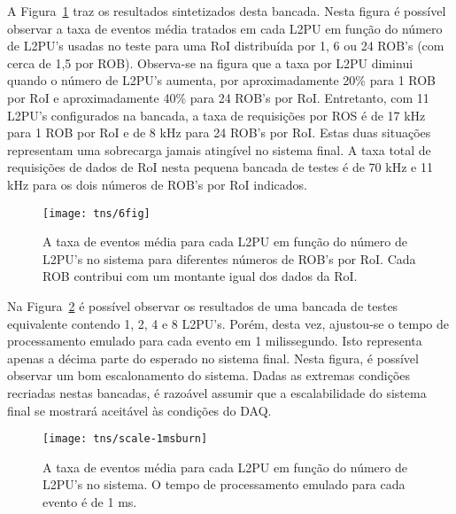 A Figura~\ref{fig:tns-6fig} traz os resultados sintetizados desta
bancada. Nesta figura é possível observar a taxa de eventos média tratados em
cada L2PU em função do número de L2PU's usadas no teste para uma RoI
distribuída por 1, 6 ou 24 ROB's (com cerca de 1,5  por
ROB). Observa-se na figura que a taxa por L2PU diminui quando o número de
L2PU's aumenta, por aproximadamente 20\% para 1 ROB por RoI e aproximadamente
40\% para 24 ROB's por RoI. Entretanto, com 11 L2PU's configurados na bancada,
a taxa de requisições por ROS é de 17 kHz para 1 ROB por RoI e de 8 kHz para
24 ROB's por RoI. Estas duas situações representam uma sobrecarga jamais
atingível no sistema final. A taxa total de requisições de dados de RoI nesta
pequena bancada de testes é de 70 kHz e 11 kHz para os dois números de ROB's
por RoI indicados.

\begin{figure}
\begin{center}
\texttt{[image: tns/6fig]}
\end{center}
\caption{A taxa de eventos média para cada L2PU em função do número de
L2PU's no sistema para diferentes números de ROB's por RoI. Cada ROB contribui
com um montante igual dos dados da RoI.}
\label{fig:tns-6fig}
\end{figure}

Na Figura~\ref{fig:tns-scale-burn} é possível observar os resultados de uma
bancada de testes equivalente contendo 1, 2, 4 e 8 L2PU's. Porém, desta vez,
ajustou-se o tempo de processamento emulado para cada evento em 1
milissegundo. Isto representa apenas a décima parte do esperado no sistema
final. Nesta figura, é possível observar um bom escalonamento do
sistema. Dadas as extremas condições recriadas nestas bancadas, é razoável
assumir que a escalabilidade do sistema final se mostrará aceitável às
condições do DAQ.

\begin{figure}
\begin{center}
\texttt{[image: tns/scale-1msburn]}
\end{center}
\caption{A taxa de eventos média para cada L2PU em função do número de L2PU's
no sistema. O tempo de processamento emulado para cada evento é de 1 ms.}
\label{fig:tns-scale-burn} 
\end{figure}


